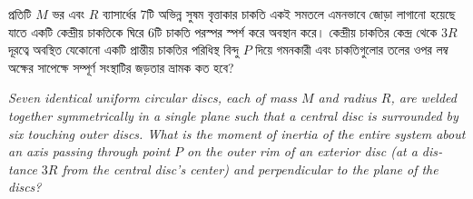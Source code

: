 \documentclass[12pt, a4paper]{article}
\begin{document}
\newpage

\begin{tcolorbox}[questionbox={প্রশ্ন (Question) 22}]
    \noindent
    প্রতিটি $M$ ভর এবং $R$ ব্যাসার্ধের $7$টি অভিন্ন সুষম বৃত্তাকার চাকতি একই সমতলে এমনভাবে জোড়া লাগানো হয়েছে যাতে একটি কেন্দ্রীয় চাকতিকে ঘিরে $6$টি চাকতি পরস্পর স্পর্শ করে অবস্থান করে। কেন্দ্রীয় চাকতির কেন্দ্র থেকে $3R$ দূরত্বে অবস্থিত যেকোনো একটি প্রান্তীয় চাকতির পরিধিস্থ বিন্দু $P$ দিয়ে গমনকারী এবং চাকতিগুলোর তলের ওপর লম্ব অক্ষের সাপেক্ষে সম্পূর্ণ সংস্থাটির জড়তার ভ্রামক কত হবে?
    
    \vspace{0.8em}
    \begin{english}
    \noindent\textit{\color{darkgray}
    Seven identical uniform circular discs, each of mass $M$ and radius $R$, are welded together symmetrically in a single plane such that a central disc is surrounded by six touching outer discs. What is the moment of inertia of the entire system about an axis passing through point $P$ on the outer rim of an exterior disc (at a distance $3R$ from the central disc's center) and perpendicular to the plane of the discs?
    }
    \end{english}
\end{tcolorbox}

\vspace{1em}
\begin{center}
\end{center}
\vspace{1em}
\end{document}

